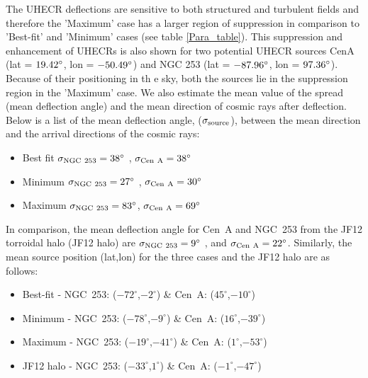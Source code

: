 \documentclass[usenatbib]{mnras}
\newcommand{\Andrew}[1]{\textcolor{dg}{#1}}
\begin{document}
The UHECR deflections are sensitive to both structured and turbulent fields and therefore the 'Maximum' case has a larger region of suppression in comparison to 'Best-fit' and 'Minimum' cases (see table \ref{Para_table}). This suppression and enhancement of UHECRs is also shown for two potential UHECR sources CenA (lat = $\rm 19.42^{\circ}$, lon = $\rm -50.49^{\circ}$) and NGC 253 (lat = $\rm -87.96^{\circ}$, lon = $\rm 97.36^{\circ}$). Because of their positioning in th  e sky, both the sources lie in the suppression region in the 'Maximum' case. We also estimate the mean value of the spread (mean deflection angle) and the mean direction of cosmic rays after deflection. Below is a list of the mean deflection angle, ($\sigma_{\rm source}$), between the mean direction and the arrival directions of the cosmic rays:
\begin{itemize}
        \item Best fit $\sigma_{\rm NGC~253} = 38^{\circ}$ , {$\sigma_{\rm Cen~A} = 38^{\circ}$}
        \item Minimum $\sigma_{\rm NGC~253} = 27^{\circ}$ , $\sigma_{\rm Cen~A} = 30^{\circ}$
        \item Maximum $\sigma_{\rm NGC~253} = 83^{\circ}$, $\sigma_{\rm Cen~A} = 69^{\circ}$
\end{itemize}
In comparison, the mean deflection angle for Cen~A and NGC~253 from the JF12 torroidal halo (JF12 halo) \cite{JF12}  are  $\sigma_{\rm NGC~253} = 9^{\circ}$ , and {$\sigma_{\rm Cen~A} = 22^{\circ}$}. %
Similarly, the mean source position (lat,lon) for the three cases and the JF12 halo are as follows:
\begin{itemize}
    \item Best-fit - NGC~253: ($-72^{\circ}$,$-2^{\circ}$) \& Cen~A: ($45^{\circ}$,$-10^{\circ}$) 
    \item Minimum - NGC~253: ($-78^{\circ}$,$-9^{\circ}$) \& Cen~A: ($16^{\circ}$,$-39^{\circ}$) 
    \item Maximum - NGC~253: ($-19^{\circ}$,$-41^{\circ}$) \& Cen~A: ($1^{\circ}$,$-53^{\circ}$) 
    \item JF12 halo - NGC~253: ($-33^{\circ}$,$1^{\circ}$) \& Cen~A: ($-1^{\circ}$,$-47^{\circ}$) 
\end{itemize}
\end{document}
